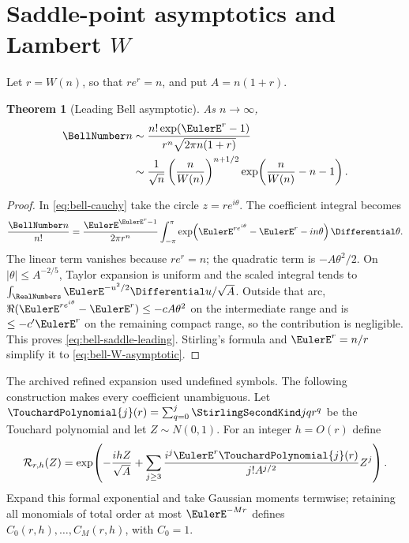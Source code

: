 \documentclass[11pt,a4paper,oneside,openany]{book}
\newtheorem{theorem}{Theorem}[chapter]
\theoremstyle{definition}
\theoremstyle{remark}
\begin{document}
\section{Saddle-point asymptotics and Lambert \texorpdfstring{$W$}{W}}
Let $r=W(n)$, so that $re^r=n$, and put $A=n(1+r)$.
\begin{theorem}[Leading Bell asymptotic]\label{thm:bell-leading-asymptotic}
As $n\to\infty$,
\begin{align}
 \BellNumber n
 &\sim \frac{n!\exp(\EulerE^r-1)}{r^n\sqrt{2\pi n(1+r)}}
 \label{eq:bell-saddle-leading}\\
 &\sim \frac1{\sqrt n}\left(\frac{n}{W(n)}\right)^{n+1/2}
       \exp\!\left(\frac{n}{W(n)}-n-1\right).
 \label{eq:bell-W-asymptotic}
\end{align}
\end{theorem}
\begin{proof}
In \eqref{eq:bell-cauchy} take the circle $z=re^{i\theta}$.  The coefficient
integral becomes
\[
 \frac{\BellNumber n}{n!}=
 \frac{\EulerE^{\EulerE^r-1}}{2\pi r^n}
 \int_{-\pi}^{\pi}
 \exp\!\left(\EulerE^{re^{i\theta}}-\EulerE^r-in\theta\right)\Differential\theta.
\]
The linear term vanishes because $re^r=n$; the quadratic term is
$-A\theta^2/2$.  On $|\theta|\le A^{-2/5}$, Taylor expansion is uniform and the
scaled integral tends to $\int_{\RealNumbers}\EulerE^{-u^2/2}\Differential u/\sqrt A$.  Outside that arc,
$\Re(\EulerE^{re^{i\theta}}-\EulerE^r)\le-cA\theta^2$ on the intermediate range and is
$\le-c'\EulerE^r$ on the remaining compact range, so the contribution is negligible.
This proves \eqref{eq:bell-saddle-leading}.  Stirling's formula and $\EulerE^r=n/r$
simplify it to \eqref{eq:bell-W-asymptotic}.
\end{proof}

The archived refined expansion used undefined symbols.  The following construction
makes every coefficient unambiguous.  Let
$\TouchardPolynomial{j}(r)=\sum_{q=0}^j\StirlingSecondKind jq r^q$ be the Touchard polynomial and let
$Z\sim N(0,1)$.  For an integer $h=O(r)$ define
\begin{equation}\label{eq:bell-saddle-correction-generator}
 \mathcal R_{r,h}(Z)=\exp\!\left(
 -\frac{ihZ}{\sqrt A}+
 \sum_{j\ge3}\frac{i^j \EulerE^r\TouchardPolynomial{j}(r)}{j!A^{j/2}}Z^j
 \right).
\end{equation}
Expand this formal exponential and take Gaussian moments termwise; retaining all
monomials of total order at most $\EulerE^{-Mr}$ defines $C_0(r,h),\ldots,C_M(r,h)$,
with $C_0=1$.
\end{document}
